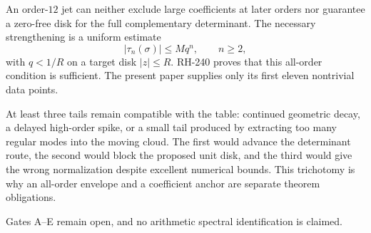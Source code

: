 \documentclass[11pt]{article}
\theoremstyle{remark}
\begin{document}
An order-$12$ jet can neither exclude large coefficients at later orders nor
guarantee a zero-free disk for the full complementary determinant.  The
necessary strengthening is a uniform estimate
\[
 |\tau_n(\sigma)|\le Mq^n,
 \qquad n\ge2,
\]
with $q<1/R$ on a target disk $|z|\le R$.  RH-240 proves that this all-order
condition is sufficient.  The present paper supplies only its first eleven
nontrivial data points.

At least three tails remain compatible with the table: continued geometric
decay, a delayed high-order spike, or a small tail produced by extracting too
many regular modes into the moving cloud.  The first would advance the
determinant route, the second would block the proposed unit disk, and the
third would give the wrong normalization despite excellent numerical bounds.
This trichotomy is why an all-order envelope and a coefficient anchor are
separate theorem obligations.

Gates A--E remain open, and no arithmetic spectral identification is claimed.



\end{document}

